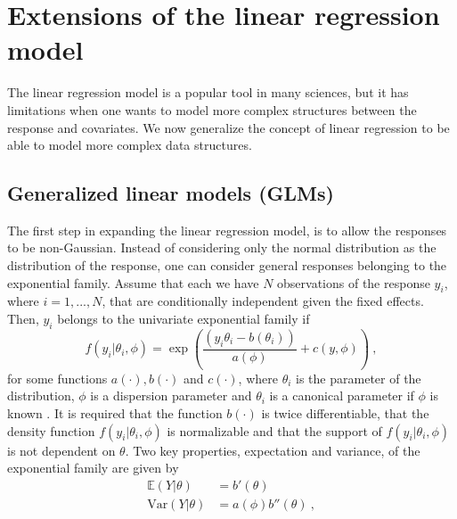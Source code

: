 \section{Extensions of the linear regression model}
The linear regression model is a popular tool in many sciences, but it has limitations when one wants to model more complex structures between the response and covariates. We now generalize the concept of linear regression to be able to model more complex data structures.
\subsection{Generalized linear models (GLMs)}
\label{sec:GLM}
The first step in expanding the linear regression model, is to allow the responses to be non-Gaussian. 
Instead of considering only the normal distribution as the distribution of the response, one can consider general responses belonging to the exponential family.
Assume that each we have $N$ observations of the response $y_{i}$, where $i=1, ..., N$, that are conditionally independent given the fixed effects.
Then, $y_{i}$ belongs to the univariate exponential family if
\begin{equation}
    \label{eq:exp_family}
    f(y_{i} \lvert \theta_{i}, \phi) = \exp\left(\frac{(y_{i}\theta_{i} - b(\theta_{i}))}{a(\phi)} + c(y, \phi) \right) \ ,
\end{equation}
for some functions $a(\cdot), b(\cdot)$ and $c(\cdot)$, where $\theta_{i}$ is the parameter of the distribution, $\phi$ is a dispersion parameter and $\theta_{i}$ is a canonical parameter if $\phi$ is known \citep{GLMM_book_old}. 
It is required that the function $b(\cdot)$ is twice differentiable, that the density function $f(y_{i} \lvert \theta_{i}, \phi)$ is normalizable and that the support of $f(y_{i} \lvert \theta_{i}, \phi)$ is not dependent on $\theta$.
Two key properties, expectation and variance, of the exponential family are given by
\begin{equation}
    \begin{aligned}
        \mathbb{E}(Y \lvert \theta) &= b'(\theta) \\
        \text{Var}(Y \lvert \theta) &= a(\phi) b''(\theta) \ ,
    \end{aligned}
\end{equation}

